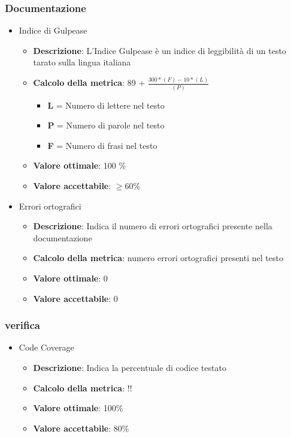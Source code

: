 \documentclass[12pt]{article}
\begin{document}
\subsubsection{Documentazione}
\begin{itemize}
	\item Indice di Gulpease
	      \begin{itemize}
		      \item \textbf{Descrizione}: L'Indice Gulpease è un indice di leggibilità di un testo tarato sulla lingua italiana
		      \item \textbf{Calcolo della metrica}:  89 + $\frac{300*(F) - 10 * (L)}{(P)}$
		            \begin{itemize}
			            \item \textbf{L} = Numero di lettere nel testo
			            \item \textbf{P} = Numero di parole nel testo
			            \item \textbf{F} = Numero di frasi nel testo
		            \end{itemize}
		      \item \textbf{Valore ottimale}: 100 \%
		      \item \textbf{Valore accettabile}: $\ge 60\%$
	      \end{itemize}
\end{itemize}
\begin{itemize}
	\item Errori ortografici
	      \begin{itemize}
		      \item \textbf{Descrizione}: Indica il numero di errori ortografici presente nella documentazione
		      \item \textbf{Calcolo della metrica}: numero errori ortografici presenti nel testo
		      \item \textbf{Valore ottimale}: 0
		      \item \textbf{Valore accettabile}: 0
	      \end{itemize}
\end{itemize}

\subsubsection{verifica}
\begin{itemize}
	\item Code Coverage
	      \begin{itemize}
		      \item \textbf{Descrizione}: Indica la percentuale di codice testato
		      \item \textbf{Calcolo della metrica}:  !!
		      \item \textbf{Valore ottimale}: 100\%
		      \item \textbf{Valore accettabile}: 80\%
	      \end{itemize}
\end{itemize}
\end{document}
